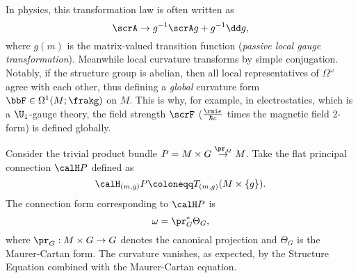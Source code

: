 \begin{rem}
    In physics, this transformation law is often written as 
    \[\scrA\to g^{-1}\scrA g+g^{-1}\dd g,\]
    where $g(m)$ is the matrix-valued transition function (\emph{passive local gauge transformation}). Meanwhile local curvature transforms by simple conjugation. Notably, if the structure group is abelian, then all local representatives of $\Omega^\omega$ agree with each other, thus defining a \emph{global} curvature form $\bbF\in\Omega^1(M;\frakg)$ on $M$. This is why, for example, in electrostatics, which is a $\U_1$-gauge theory, the field strength $\scrF$ ($\frac{\rmi e}{\hbar c}$ times the magnetic field 2-form) is defined globally.
\end{rem}
 



\begin{example}\label{ex 1.3.18 RS2}
    Consider the trivial product bundle $P=M\times G\overset{\pr_M}{\to}M$. Take the flat principal connection $\calH P$ defined as 
    \[\calH_{(m,g)}P\coloneqq T_{(m,g)}(M\times \{g\}).\]
    The connection form corresponding to $\calH P$ is
    \[\omega=\pr_G^\ast \Theta_G,\]
    where $\pr_G:M\times G\to G$ denotes the canonical projection and $\Theta_G$ is the Maurer-Cartan form. The curvature vanishes, as expected, by the Structure Equation combined with the Maurer-Cartan equation.
\end{example}

